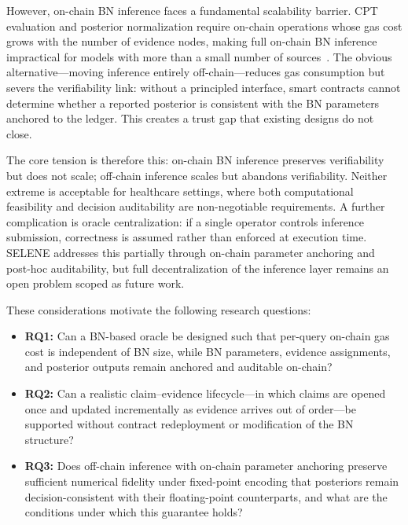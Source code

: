 \documentclass[journal]{IEEEtran}
\begin{document}
However, on-chain BN inference faces a fundamental
scalability barrier.
CPT evaluation and posterior normalization require
on-chain operations whose gas cost grows with the number
of evidence nodes, making full on-chain BN inference
impractical for models with more than a small number of
sources~\cite{bn-oracle}.
The obvious alternative---moving inference entirely
off-chain---reduces gas consumption but severs the
verifiability link: without a principled interface, smart
contracts cannot determine whether a reported posterior is
consistent with the BN parameters anchored to the ledger.
This creates a trust gap that existing designs do not
close.

The core tension is therefore this: on-chain BN inference
preserves verifiability but does not scale; off-chain
inference scales but abandons verifiability.
Neither extreme is acceptable for healthcare settings,
where both computational feasibility and decision
auditability are non-negotiable requirements.
A further complication is oracle centralization: if a
single operator controls inference submission, correctness
is assumed rather than enforced at execution time.
SELENE addresses this partially through on-chain parameter
anchoring and post-hoc auditability, but full
decentralization of the inference layer remains an open
problem scoped as future work.

These considerations motivate the following research
questions:

\begin{itemize}
  \item \textbf{RQ1:} Can a BN-based oracle be designed
  such that per-query on-chain gas cost is independent of
  BN size, while BN parameters, evidence assignments, and
  posterior outputs remain anchored and auditable on-chain?

  \item \textbf{RQ2:} Can a realistic claim--evidence
  lifecycle---in which claims are opened once and updated
  incrementally as evidence arrives out of order---be
  supported without contract redeployment or modification
  of the BN structure?

  \item \textbf{RQ3:} Does off-chain inference with
  on-chain parameter anchoring preserve sufficient
  numerical fidelity under fixed-point encoding that
  posteriors remain decision-consistent with their
  floating-point counterparts, and what are the conditions
  under which this guarantee holds?
\end{itemize}
\end{document}
